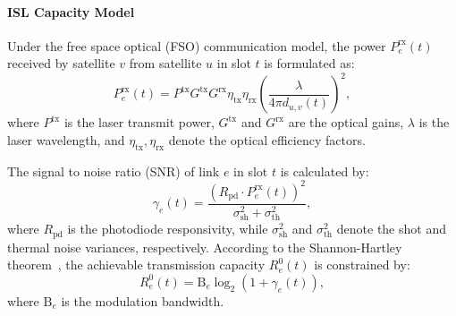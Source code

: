 \documentclass[10pt, conference, letterpaper]{IEEEtran}
\begin{document}
\paragraph{ISL Capacity Model}

Under the free space optical (FSO) communication model, the power $P_{e}^{\text{rx}}(t)$ received by satellite $v$ from satellite $u$ in slot $t$ is formulated as:
\begin{equation}
P_{e}^{\text{rx}}(t) = P^{\text{tx}} G^{\text{tx}} G^{\text{rx}} \eta_{\text{tx}} \eta_{\text{rx}} \left(\frac{\lambda}{4\pi d_{u,v}(t)}\right)^2,
\label{eq:received_power}
\end{equation}
where $P^{\text{tx}}$ is the laser transmit power, 
$G^{\text{tx}}$ and $G^{\text{rx}}$ are the optical gains, 
$\lambda$ is the laser wavelength, and $\eta_{\text{tx}}, \eta_{\text{rx}}$ denote the optical efficiency factors.

The signal to noise ratio (SNR) of link $e$ in slot $t$ is calculated by:
\begin{equation}
\gamma_{e}(t) = \frac{\left({R}_{\text{pd}} \cdot P_{e}^{\text{rx}}(t)\right)^2}{\sigma_{\text{sh}}^2 + \sigma_{\text{th}}^2},
\label{eq:snr_formal}
\end{equation}
where ${R}_{\text{pd}}$ is the photodiode responsivity, while $\sigma_{\text{sh}}^2$ and $\sigma_{\text{th}}^2$ denote the shot and thermal noise variances, respectively.
According to the Shannon-Hartley theorem~\cite{IPIS_sate}, the achievable transmission capacity $R^0_{e}(t)$ is constrained by:
\begin{equation}
R^0_{e}(t) =  \mathrm{B}_{e} \log_2 \left( 1 + \gamma_{e}(t) \right),
\label{eq:shannon_capacity}
\end{equation}
where $\mathrm{B}_{e}$ is the modulation bandwidth.
\end{document}
